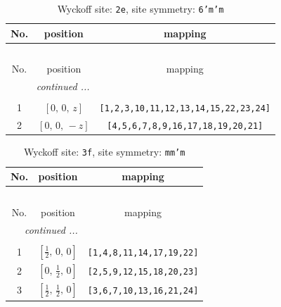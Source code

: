 \documentclass[fleqn,8pt]{jsarticle}
\begin{document}
\begin{longtable}{ccc}
\caption{Wyckoff site: {\tt 2e}, site symmetry: {\tt 6'm'm}}
 \\
 \hline \hline
No. & position & mapping \\ \hline \endfirsthead

\multicolumn{2}{l}{\tablename\ \thetable{}} \\
 \hline \hline
No. & position & mapping \\ \hline \endhead

 \hline \hline
\multicolumn{2}{r}{\footnotesize\it continued ...} \\ \endfoot

 \hline \hline
\multicolumn{2}{r}{} \\ \endlastfoot

1 & $\left[ 0,\, 0,\, z \right]$ & {\tt [1,2,3,10,11,12,13,14,15,22,23,24]} \\ \hline
2 & $\left[ 0,\, 0,\, - z \right]$ & {\tt [4,5,6,7,8,9,16,17,18,19,20,21]} \\
\end{longtable}
\renewcommand{\arraystretch}{1.2}
\begin{longtable}{ccc}
\caption{Wyckoff site: {\tt 3f}, site symmetry: {\tt mm'm}}
 \\
 \hline \hline
No. & position & mapping \\ \hline \endfirsthead

\multicolumn{2}{l}{\tablename\ \thetable{}} \\
 \hline \hline
No. & position & mapping \\ \hline \endhead

 \hline \hline
\multicolumn{2}{r}{\footnotesize\it continued ...} \\ \endfoot

 \hline \hline
\multicolumn{2}{r}{} \\ \endlastfoot

1 & $\left[ \frac{1}{2},\, 0,\, 0 \right]$ & {\tt [1,4,8,11,14,17,19,22]} \\ \hline
2 & $\left[ 0,\, \frac{1}{2},\, 0 \right]$ & {\tt [2,5,9,12,15,18,20,23]} \\ \hline
3 & $\left[ \frac{1}{2},\, \frac{1}{2},\, 0 \right]$ & {\tt [3,6,7,10,13,16,21,24]} \\
\end{longtable}
\renewcommand{\arraystretch}{1.2}
\end{document}
